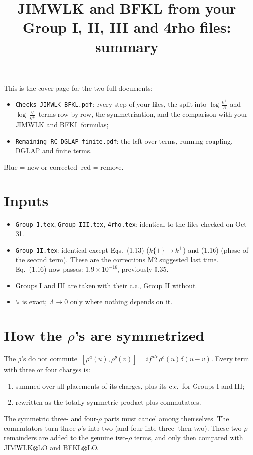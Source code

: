\documentclass[10pt]{article}
\title{JIMWLK and BFKL from your Group I, II, III and 4rho files: summary}
\date{}
\newcommand{\new}[1]{{\color{blue}#1}}
\newcommand{\old}[1]{{\color{red}\sout{#1}}}
\begin{document}
\maketitle
\noindent This is the cover page for the two full documents:
\begin{itemize}
\item \texttt{Checks\_JIMWLK\_BFKL.pdf}: every step of your files, the split into $\log\frac{k^+}{\Lambda}$ and $\log\frac{\vee}{k^+}$ terms row by row, the symmetrization, and the comparison with your JIMWLK and BFKL formulas;
\item \texttt{Remaining\_RC\_DGLAP\_finite.pdf}: the left-over terms, running coupling, DGLAP and finite terms.
\end{itemize}
\new{Blue} = new or corrected, \old{red} = remove.

\section{Inputs}
\begin{itemize}
\item \texttt{Group\_I.tex}, \texttt{Group\_III.tex}, \texttt{4rho.tex}: identical to the files checked on Oct 31.
\item \texttt{Group\_II.tex}: identical except Eqs.~(1.13) ($k\{+\}\to k^+$) and (1.16) (phase of the second term). These are the corrections M2 suggested last time. Eq.~(1.16) now passes: $1.9\times10^{-16}$, previously $0.35$.
\item Groups I and III are taken with their c.c., Group II without.
\item $\vee$ is exact; $\Lambda\to0$ only where nothing depends on it.
\end{itemize}

\section{How the $\rho$'s are symmetrized}
The $\rho$'s do not commute, $[\rho^a(u),\rho^b(v)]=if^{abc}\rho^c(u)\delta(u-v)$. Every term with three or four charges is:
\begin{enumerate}
\item summed over all placements of its charges, plus its c.c.\ for Groups I and III;
\item rewritten as the totally symmetric product plus commutators.
\end{enumerate}
The symmetric three- and four-$\rho$ parts must cancel among themselves. The commutators turn three $\rho$'s into two (and four into three, then two). These two-$\rho$ remainders are added to the genuine two-$\rho$ terms, and only then compared with JIMWLK$\otimes$LO and BFKL$\otimes$LO.
\end{document}
